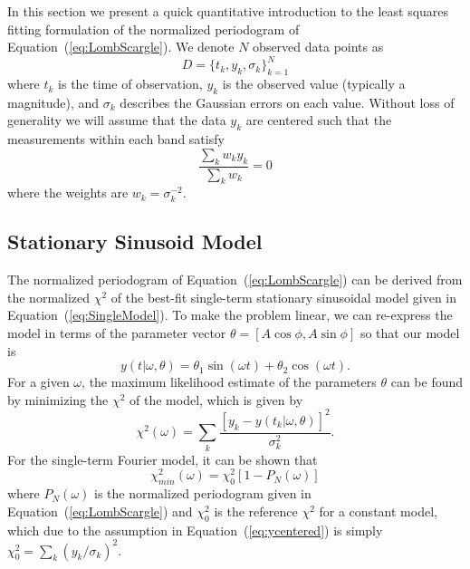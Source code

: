 \documentclass[12pt,preprint]{aastex}
\newcommand{\Eq}[1]{Equation~(\ref{eq:#1})}
\newcommand{\eq}[1]{\Eq{#1}}
\newcommand{\eqlabel}[1]{\label{eq:#1}}
\begin{document}
In this section we present a quick quantitative introduction to the least squares fitting formulation of the normalized periodogram of \eq{LombScargle}. We denote $N$ observed data points as
\begin{equation}
  D = \{t_k, y_k, \sigma_k\}_{k=1}^N
\end{equation}
where $t_k$ is the time of observation, $y_k$ is the observed value (typically a magnitude), and $\sigma_k$ describes the Gaussian errors on each value. Without loss of generality we will assume that the data $y_k$ are centered such that the measurements within each band satisfy
\begin{equation}
  \eqlabel{ycentered}
  \frac{\sum_k w_ky_k}{\sum_k w_k} = 0
\end{equation}
where the weights are $w_k = \sigma_k^{-2}$.

\subsection{Stationary Sinusoid Model}

The normalized periodogram of \eq{LombScargle} can be derived from the normalized $\chi^2$ of the best-fit single-term stationary sinusoidal model given in \eq{SingleModel}. To make the problem linear, we can re-express the model in terms of the parameter vector $\theta = [A\cos\phi, A\sin\phi]$ so that our model is
\begin{equation}
  \eqlabel{simplemodel}
  y(t|\omega,\theta) = \theta_1\sin(\omega t) + \theta_2\cos(\omega t).
\end{equation}
For a given $\omega$, the maximum likelihood estimate of the parameters $\theta$ can be found by minimizing the $\chi^2$ of the model, which is given by
\begin{equation}
  \chi^2(\omega) = \sum_k \frac{[y_k - y(t_k|\omega,\theta)]^2}{\sigma_k^2}.
\end{equation}
For the single-term Fourier model, it can be shown \citep[See, e.g.][]{ICVG2014} that
\begin{equation}
  \eqlabel{chi2PN}
  \chi_{min}^2(\omega) = \chi^2_0[1 - P_N(\omega)]
\end{equation}
where $P_N(\omega)$ is the normalized periodogram given in \eq{LombScargle} and $\chi^2_0$ is the reference $\chi^2$ for a constant model, which due to the assumption in \eq{ycentered} is simply $\chi^2_0 = \sum_k (y_k/\sigma_k)^2$.
\end{document}
